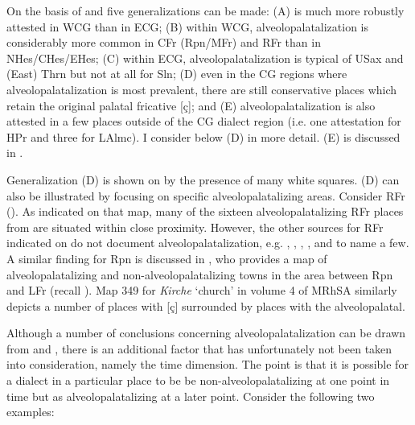 \begin{xlist}
On the basis of  and  five generalizations can be made: (A)  is much more robustly attested in WCG than in ECG; (B) within WCG, alveolopalatalization is considerably more common in CFr (Rpn\slash{}MFr) and RFr than in NHes\slash{}CHes/EHes; (C) within ECG, alveolopalatalization is typical of USax and (East) Thrn but not at all for Sln; (D) even in the CG regions where alveolopalatalization is most prevalent, there are still conservative places which retain the original palatal fricative [ç]; and (E) alveolopalatalization is also attested in a few places outside of the CG dialect region (i.e. one attestation for HPr and three for LAlmc). I consider below (D) in more detail. (E) is discussed in .\pagebreak

\begin{sloppypar}
Generalization (D) is shown on  by the presence of many white squares. (D) can also be illustrated by focusing on specific alveolopalatalizing areas. Consider RFr (). As indicated on that map, many of the sixteen alveolopalatalizing RFr places from  are situated within close proximity. However, the other sources for RFr indicated on  do not document alveolopalatalization, e.g. \citet[4]{Heeger1896}, \citet[67]{Wanner1908}, \citet[44]{Wenz1911}, \citet[9, 74]{Reichert1914}, and \citet[57--58]{Seibt1930} to name a few. A similar finding for Rpn is discussed in \citet[398--399]{Cornelissen2000}, who provides a map of alveolopalatalizing and non-alveolopalatalizing towns in the area between Rpn and LFr (recall ). Map 349 for \textit{Kirche} ‘church’ in volume 4 of MRhSA similarly depicts a number of places with [ç] surrounded by places with the alveolopalatal.
\end{sloppypar}

Although a number of conclusions concerning alveolopalatalization can be drawn from  and , there is an additional factor that has unfortunately not been taken into consideration, namely the time dimension. The point is that it is possible for a dialect in a particular place to be be non-al\-ve\-o\-lo\-pal\-a\-tal\-i\-zing at one point in time but as alveolopalatalizing at a later point. Consider the following two examples:


\end{xlist}
